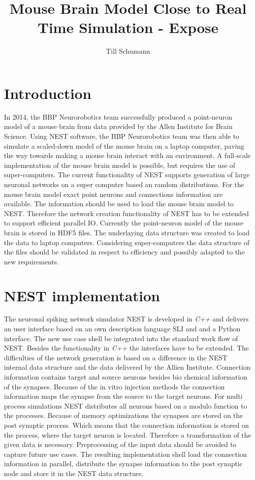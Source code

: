 \documentclass[a4paper]{article}
\title{Mouse Brain Model Close to Real Time Simulation - Expose}
\author{Till Schumann}
\begin{document}
   \maketitle


\section{Introduction}
In 2014, the BBP Neurorobotics team successfully produced a point-neuron model
of a mouse brain from data provided by the Allen Institute for Brain Science.
Using NEST software, the BBP Neurorobotics team was then able to simulate a
scaled-down model of the mouse brain on a laptop computer, paving the way towards
making a mouse brain interact with an environment. A full-scale implementation of
the mouse brain model is possible, but requires the use of super-computers.
The current functionality of NEST supports  generation of large neuronal networks
on a super computer based an random distributions. For the mouse brain model
exact point neurons and connections information are available. The information should
be used to load the mouse brain model to NEST. Therefore the network creation
functionality of NEST has to be extended to support efficient parallel IO.
Currently the point-neuron model of the mouse brain is stored in HDF5 files.
The underlaying data structure was created to load the data to laptop computers.
Considering super-computers the data structure of the files should be
validated in respect to efficiency and possibly adapted to the new requirements.


\section{NEST implementation}

The neuronal spiking network simulator NEST is developed in \emph{C++} and delivers
an user interface based on an own description language SLI and  and a Python interface.
The new use case shell be integrated into the standard work flow of NEST.
Besides the functionality in \emph{C++} the interfaces have to be extended.
The difficulties of the network generation is based on a difference in 
the NEST internal data structure and the data delivered by the Allien Institute.
Connection information contains target and source neurons besides bio chemical
information of the synapses. Because of the in vitro injection methods the
connection information maps the synapse from the source to the target neurons.
For multi process simulations NEST distributes all neurons based on a modulo function 
to the processes. Because of memory optimizations the synapses are stored on the
post synaptic process. Which means that the connection information is stored
on the process, where the target neuron is located. Therefore a transformation of the given data is
necessary. Preprocessing of the input data should be avoided to capture future use cases.
The resulting implementation shell load the connection information in parallel,
distribute the synapse information to the post synaptic node and store it in
the NEST data structure.
\end{document}
